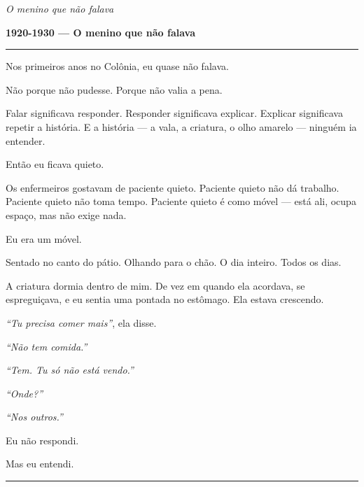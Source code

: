 
\noindent \textit{O menino que não falava}

\noindent \textbf{1920-1930 --- O menino que não falava}

\vspace{0.5em}\noindent\rule{\textwidth}{0.5pt}\vspace{0.5em}

\noindent Nos primeiros anos no Colônia, eu quase não falava.

\noindent Não porque não pudesse. Porque não valia a pena.

\noindent Falar significava responder. Responder significava explicar. Explicar significava repetir a história. E a história --- a vala, a criatura, o olho amarelo --- ninguém ia entender.

\noindent Então eu ficava quieto.

\noindent Os enfermeiros gostavam de paciente quieto. Paciente quieto não dá trabalho. Paciente quieto não toma tempo. Paciente quieto é como móvel --- está ali, ocupa espaço, mas não exige nada.

\noindent Eu era um móvel.

\noindent Sentado no canto do pátio. Olhando para o chão. O dia inteiro. Todos os dias.

\noindent A criatura dormia dentro de mim. De vez em quando ela acordava, se espreguiçava, e eu sentia uma pontada no estômago. Ela estava crescendo.

\noindent \textit{\textquotedblleft{}Tu precisa comer mais\textquotedblright{}}, ela disse.

\noindent \textit{\textquotedblleft{}Não tem comida.\textquotedblright{}}

\noindent \textit{\textquotedblleft{}Tem. Tu só não está vendo.\textquotedblright{}}

\noindent \textit{\textquotedblleft{}Onde?\textquotedblright{}}

\noindent \textit{\textquotedblleft{}Nos outros.\textquotedblright{}}

\noindent Eu não respondi.

\noindent Mas eu entendi.

\vspace{0.5em}\noindent\rule{\textwidth}{0.5pt}\vspace{0.5em}

